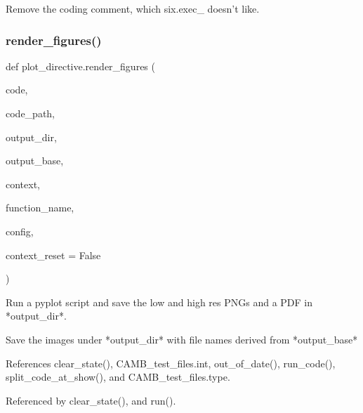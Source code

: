\begin{DoxyVerb}Remove the coding comment, which six.exec_ doesn't like.
\end{DoxyVerb}
 \mbox{\label{namespaceplot__directive_a659cae721da23d794cb3967690a166db}} 
\subsubsection{\texorpdfstring{render\+\_\+figures()}{render\_figures()}}
{\footnotesize\ttfamily def plot\+\_\+directive.\+render\+\_\+figures (\begin{DoxyParamCaption}\item[{}]{code,  }\item[{}]{code\+\_\+path,  }\item[{}]{output\+\_\+dir,  }\item[{}]{output\+\_\+base,  }\item[{}]{context,  }\item[{}]{function\+\_\+name,  }\item[{}]{config,  }\item[{}]{context\+\_\+reset = {\ttfamily False} }\end{DoxyParamCaption})}

\begin{DoxyVerb}Run a pyplot script and save the low and high res PNGs and a PDF
in *output_dir*.

Save the images under *output_dir* with file names derived from
*output_base*
\end{DoxyVerb}
 

References clear\+\_\+state(), C\+A\+M\+B\+\_\+test\+\_\+files.\+int, out\+\_\+of\+\_\+date(), run\+\_\+code(), split\+\_\+code\+\_\+at\+\_\+show(), and C\+A\+M\+B\+\_\+test\+\_\+files.\+type.



Referenced by clear\+\_\+state(), and run().

